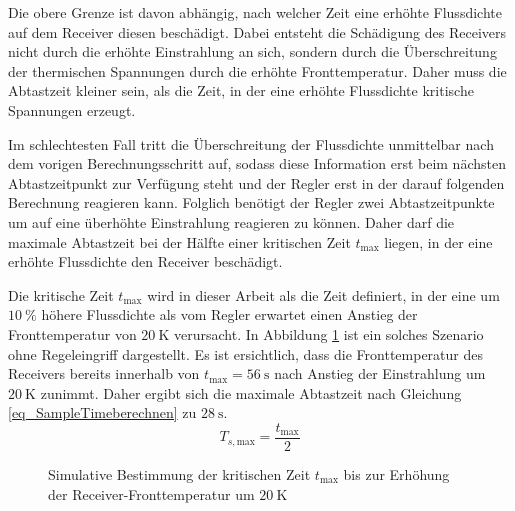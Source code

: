 Die obere Grenze ist davon abhängig, nach welcher Zeit eine erhöhte Flussdichte auf dem Receiver diesen beschädigt.
Dabei entsteht die Schädigung des Receivers nicht durch die erhöhte Einstrahlung an sich, sondern durch die Überschreitung der thermischen Spannungen durch die erhöhte Fronttemperatur.
Daher muss die Abtastzeit kleiner sein, als die Zeit, in der eine erhöhte Flussdichte kritische Spannungen erzeugt.

Im schlechtesten Fall tritt die Überschreitung der Flussdichte unmittelbar nach dem vorigen Berechnungsschritt auf, sodass diese Information erst beim nächsten Abtastzeitpunkt zur Verfügung steht und der Regler erst in der darauf folgenden Berechnung reagieren kann.
Folglich benötigt der Regler zwei Abtastzeitpunkte um auf eine überhöhte Einstrahlung reagieren zu können.
Daher darf die maximale Abtastzeit bei der Hälfte einer kritischen Zeit $t_{\mathrm{max}}$ liegen, in der eine erhöhte Flussdichte den Receiver beschädigt.

Die kritische Zeit $t_{\mathrm{max}}$ wird in dieser Arbeit als die Zeit definiert, in der eine um $\SI{10}{\percent}$ höhere Flussdichte als vom Regler erwartet einen Anstieg der Fronttemperatur von $\SI{20}{\kelvin}$ verursacht.
In Abbildung \ref{fig_SampleTimebestimmen} ist ein solches Szenario ohne Regeleingriff dargestellt.
Es ist ersichtlich, dass die Fronttemperatur des Receivers bereits innerhalb von $t_{\mathrm{max}} = \SI{56}{\second}$ nach Anstieg der Einstrahlung um $\SI{20}{\kelvin}$ zunimmt.
Daher ergibt sich die maximale Abtastzeit nach Gleichung \ref{eq_SampleTimeberechnen} zu $\SI{28}{\second}$.
\begin{equation} \label{eq_SampleTimeberechnen}
    T_{s, \mathrm{max}} = \frac{t_{\mathrm{max}}}{2}
\end{equation}

\begin{figure}[h!]
    \centering
    \setlength{\fboxsep}{1pt}
    \setlength{\fboxrule}{1pt}
    \caption[Simulative Bestimmung der kritischen Zeit $t_{\mathrm{max}}$ bis zur Erhöhung der Receiver-Fronttemperatur um $\SI{10}{\kelvin}$]{Simulative Bestimmung der kritischen Zeit $t_{\mathrm{max}}$ bis zur Erhöhung der Receiver-Fronttemperatur um $\SI{20}{\kelvin}$}
    \label{fig_SampleTimebestimmen}
\end{figure}

